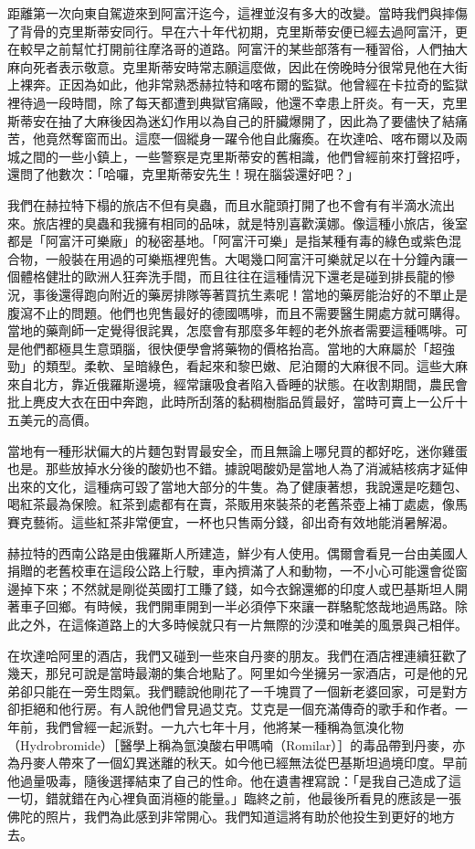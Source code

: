 距離第一次向東自駕遊來到阿富汗迄今，這裡並沒有多大的改變。當時我們與摔傷了背骨的克里斯蒂安同行。早在六十年代初期，克里斯蒂安便已經去過阿富汗，更在較早之前幫忙打開前往摩洛哥的道路。阿富汗的某些部落有一種習俗，人們抽大麻向死者表示敬意。克里斯蒂安時常志願這麼做，因此在傍晚時分很常見他在大街上裸奔。正因為如此，他非常熟悉赫拉特和喀布爾的監獄。他曾經在卡拉奇的監獄裡待過一段時間，除了每天都遭到典獄官痛毆，他還不幸患上肝炎。有一天，克里斯蒂安在抽了大麻後因為迷幻作用以為自己的肝臟爆開了，因此為了要儘快了結痛苦，他竟然奪窗而出。這麼一個縱身一躍令他自此癱瘓。在坎達哈、喀布爾以及兩城之間的一些小鎮上，一些警察是克里斯蒂安的舊相識，他們曾經前來打聲招呼，還問了他數次：「哈囉，克里斯蒂安先生！現在腦袋還好吧？」

我們在赫拉特下榻的旅店不但有臭蟲，而且水龍頭打開了也不會有有半滴水流出來。旅店裡的臭蟲和我擁有相同的品味，就是特別喜歡漢娜。像這種小旅店，後室都是「阿富汗可樂廠」的秘密基地。「阿富汗可樂」是指某種有毒的綠色或紫色混合物，一般裝在用過的可樂瓶裡兜售。大喝幾口阿富汗可樂就足以在十分鐘內讓一個體格健壯的歐洲人狂奔洗手間，而且往往在這種情況下還老是碰到排長龍的慘況，事後還得跑向附近的藥房排隊等著買抗生素呢！當地的藥房能治好的不單止是腹瀉不止的問題。他們也兜售最好的德國嗎啡，而且不需要醫生開處方就可購得。當地的藥劑師一定覺得很詫異，怎麼會有那麼多年輕的老外旅者需要這種嗎啡。可是他們都極具生意頭腦，很快便學會將藥物的價格抬高。當地的大麻屬於「超強勁」的類型。柔軟、呈暗綠色，看起來和黎巴嫩、尼泊爾的大麻很不同。這些大麻來自北方，靠近俄羅斯邊境，經常讓吸食者陷入昏睡的狀態。在收割期間，農民會批上麂皮大衣在田中奔跑，此時所刮落的黏稠樹脂品質最好，當時可賣上一公斤十五美元的高價。

當地有一種形狀偏大的片麵包對胃最安全，而且無論上哪兒買的都好吃，迷你雞蛋也是。那些放掉水分後的酸奶也不錯。據說喝酸奶是當地人為了消滅結核病才延伸出來的文化，這種病可毀了當地大部分的牛隻。為了健康著想，我說還是吃麵包、喝紅茶最為保險。紅茶到處都有在賣，茶販用來裝茶的老舊茶壺上補丁處處，像馬賽克藝術。這些紅茶非常便宜，一杯也只售兩分錢，卻出奇有效地能消暑解渴。

赫拉特的西南公路是由俄羅斯人所建造，鮮少有人使用。偶爾會看見一台由美國人捐贈的老舊校車在這段公路上行駛，車內擠滿了人和動物，一不小心可能還會從窗邊掉下來；不然就是剛從英國打工賺了錢，如今衣錦還鄉的印度人或巴基斯坦人開著車子回鄉。有時候，我們開車開到一半必須停下來讓一群駱駝悠哉地過馬路。除此之外，在這條道路上的大多時候就只有一片無際的沙漠和唯美的風景與己相伴。

在坎達哈阿里的酒店，我們又碰到一些來自丹麥的朋友。我們在酒店裡連續狂歡了幾天，那兒可說是當時最潮的集合地點了。阿里如今坐擁另一家酒店，可是他的兄弟卻只能在一旁生悶氣。我們聽說他剛花了一千塊買了一個新老婆回家，可是對方卻拒絕和他行房。有人說他們曾見過艾克。艾克是一個充滿傳奇的歌手和作者。一年前，我們曾經一起派對。一九六七年十月，他將某一種稱為氫溴化物（Hydrobromide）［醫學上稱為氫溴酸右甲嗎喃（Romilar）］的毒品帶到丹麥，亦為丹麥人帶來了一個幻異迷離的秋天。如今他已經無法從巴基斯坦過境印度。早前他過量吸毒，隨後選擇結束了自己的性命。他在遺書裡寫說：「是我自己造成了這一切，錯就錯在內心裡負面消極的能量。」臨終之前，他最後所看見的應該是一張佛陀的照片，我們為此感到非常開心。我們知道這將有助於他投生到更好的地方去。

